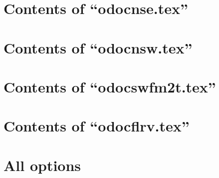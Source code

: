 \section{Contents of ``odocnse.tex''}

\begin{itemize}

\end{itemize}

\section{Contents of ``odocnsw.tex''}

\begin{itemize}

\end{itemize}

\section{Contents of ``odocswfm2t.tex''}

\begin{itemize}

\end{itemize}

\section{Contents of ``odocflrv.tex''}

\begin{itemize}

\end{itemize}

\section{All options}

\begin{itemize}

\end{itemize}

